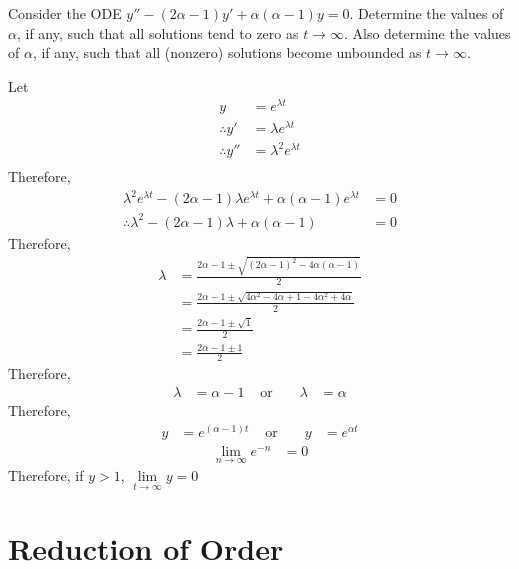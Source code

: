 \documentclass[fleqn, a4paper, 11pt, oneside]{amsart}
\theoremstyle{definition}
\theoremstyle{theorem}
\begin{document}
\begin{question}
	Consider the ODE $y'' - (2 \alpha - 1) y' + \alpha (\alpha - 1) y = 0$.
	Determine the values of $\alpha$, if any, such that all solutions tend to zero as $t \to \infty$.
	Also determine the values of $\alpha$, if any, such that all (nonzero) solutions become unbounded as $t \to \infty$.
\end{question}

\begin{solution}
	Let
	\begin{align*}
		y              & = e^{\lambda t}           \\
		\therefore y'  & = \lambda e^{\lambda t}   \\
		\therefore y'' & = \lambda^2 e^{\lambda t} \\
	\end{align*}
	Therefore,
	\begin{align*}
		\lambda^2 e^{\lambda t} - (2 \alpha - 1) \lambda e^{\lambda t} + \alpha (\alpha - 1) e^{\lambda t} &= 0\\
		\therefore \lambda^2 - (2 \alpha - 1) \lambda + \alpha (\alpha - 1) &= 0
	\end{align*}
	Therefore,
	\begin{align*}
		\lambda &= \frac{2 \alpha - 1 \pm \sqrt{(2 \alpha - 1)^2 - 4 \alpha (\alpha - 1)}}{2}\\
		&= \frac{2 \alpha - 1 \pm \sqrt{4 \alpha^2 - 4 \alpha + 1 - 4 \alpha^2 + 4 \alpha}}{2}\\
		&= \frac{2 \alpha - 1 \pm \sqrt{1}}{2}\\
		&= \frac{2 \alpha - 1 \pm 1}{2}
	\end{align*}
	Therefore,
	\begin{align*}
		\lambda & = \alpha - 1 & \text{ or } &  & \lambda & = \alpha
	\end{align*}
	Therefore,
	\begin{align*}
		y & = e^{(\alpha - 1) t} & \text{ or } &  & y & = e^{\alpha t}
	\end{align*}
	\begin{align*}
		\lim\limits_{n \to \infty} e^{-n} &= 0
	\end{align*}
	Therefore, if $y > 1$, $\lim\limits_{t \to \infty} y = 0$
\end{solution}

\part{Reduction of Order}
\end{document}
